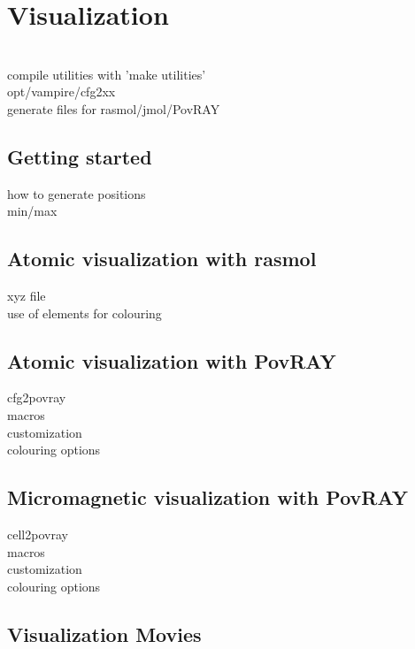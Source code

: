 \chapter{Visualization}\label{chap:visualization}

\vampire \\
compile utilities with 'make utilities'\\
opt/vampire/cfg2xx\\
generate files for rasmol/jmol/PovRAY\\

\section*{Getting started}
how to generate positions\\
min/max\\

\section*{Atomic visualization with rasmol}
xyz file\\
use of elements for colouring\\

\section*{Atomic visualization with PovRAY}
cfg2povray\\
macros\\
customization\\
colouring options\\

\section*{Micromagnetic visualization with PovRAY}
cell2povray\\
macros\\
customization\\
colouring options\\

\section*{Visualization Movies}

